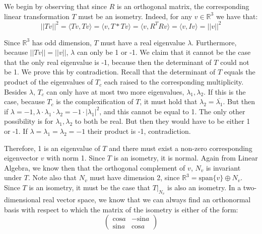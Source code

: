 \begin{solution}

    We begin by observing that since $R$ is an orthogonal matrix, the corresponding linear transformation $T$ must be an isometry. Indeed, for any $v \in \mathbb{R}^3$ we have that:
    $$\lvert \lvert T v \rvert \rvert^2 = \langle Tv, Tv \rangle = \langle v, T*Tv \rangle = \langle v, R^TRv \rangle = \langle v, Iv \rangle = \lvert \lvert v \rvert \rvert^2$$
    
    Since $\mathbb{R}^3$ has odd dimension, $T$ must have a real eigenvalue $\lambda$. Furthermore, because $\lvert \lvert T v \rvert \rvert = \lvert \lvert v \rvert \rvert$, $\lambda$ can only be 1 or -1. We claim that it cannot be the case that the only real eigenvalue is -1, because then the determinant of $T$ could not be 1. We prove this by contradiction. Recall that the determinant of $T$ equals the product of the eigenvalues of $T_c$ each raised to the corresponding multiplicity. Besides $\lambda$, $T_c$ can only have at most two more eigenvalues, $\lambda_1, \lambda_2$. If this is the case, because $T_c$ is the complexification of $T$, it must hold that $\lambda_2 = \overline{\lambda_1}$. But then if $\lambda = -1, \lambda \cdot \lambda_1 \cdot \lambda_2 = -1\cdot \lvert \lambda_1 \rvert^2$, and this cannot be equal to 1. The only other possibility is for $\lambda_1, \lambda_2$ to both be real. But then they would have to be either 1 or -1. If $\lambda = \lambda_1 = \lambda_2 = -1$ their product is -1, contradiction.
    
    Therefore, 1 is an eigenvalue of $T$ and there must exist a non-zero corresponding eigenvector $v$ with norm 1. Since $T$ is an isometry, it is normal. Again from Linear Algebra, we know then that the orthogonal complement of $v$, $N_v$ is invariant under $T$. Note also that $N_v$ must have dimension 2, since $\mathbb{R}^3 = \text{span}\{v\} \oplus N_v$. Since $T$ is an isometry, it must be the case that $T|_{N_v}$ is also an isometry. In a two-dimensional real vector space, we know that we can always find an orthonormal basis with respect to which the matrix of the isometry is either of the form:
    $$\begin{pmatrix}
        \text{cos} a & -\text{sin} a \\
        \text{sin} a & \text{cos} a
    \end{pmatrix}$$


\end{solution}
